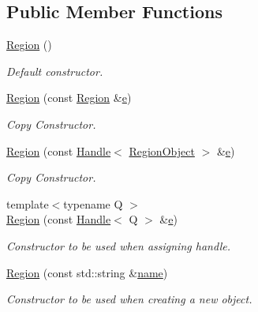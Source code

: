 \subsection*{Public Member Functions}
\begin{DoxyCompactItemize}
\item 
\hyperlink{class_d_d4hep_1_1_geometry_1_1_region_ac8a2149581dcb28deb871bc812749cd7}{Region} ()
\begin{DoxyCompactList}\small\item\em Default constructor. \end{DoxyCompactList}\item 
\hyperlink{class_d_d4hep_1_1_geometry_1_1_region_a81c2f0b5d7cd042c22af48acd27bf95c}{Region} (const \hyperlink{class_d_d4hep_1_1_geometry_1_1_region}{Region} \&\hyperlink{_volumes_8cpp_a8a9a1f93e9b09afccaec215310e64142}{e})
\begin{DoxyCompactList}\small\item\em Copy Constructor. \end{DoxyCompactList}\item 
\hyperlink{class_d_d4hep_1_1_geometry_1_1_region_a965bf209a05655ee147c4adcdddfe20f}{Region} (const \hyperlink{class_d_d4hep_1_1_handle}{Handle}$<$ \hyperlink{class_d_d4hep_1_1_geometry_1_1_region_object}{Region\+Object} $>$ \&\hyperlink{_volumes_8cpp_a8a9a1f93e9b09afccaec215310e64142}{e})
\begin{DoxyCompactList}\small\item\em Copy Constructor. \end{DoxyCompactList}\item 
{\footnotesize template$<$typename Q $>$ }\\\hyperlink{class_d_d4hep_1_1_geometry_1_1_region_a136426a6dfe980558ce66bd5e8240ca3}{Region} (const \hyperlink{class_d_d4hep_1_1_handle}{Handle}$<$ Q $>$ \&\hyperlink{_volumes_8cpp_a8a9a1f93e9b09afccaec215310e64142}{e})
\begin{DoxyCompactList}\small\item\em Constructor to be used when assigning handle. \end{DoxyCompactList}\item 
\hyperlink{class_d_d4hep_1_1_geometry_1_1_region_a424fc2f2e54dd1bbf099b4810f9c4710}{Region} (const std\+::string \&\hyperlink{class_d_d4hep_1_1_handle_a27c7d467a609ab32c133e1f3c7d85ef5}{name})
\begin{DoxyCompactList}\small\item\em Constructor to be used when creating a new object. \end{DoxyCompactList}\item 

\end{DoxyCompactItemize}
